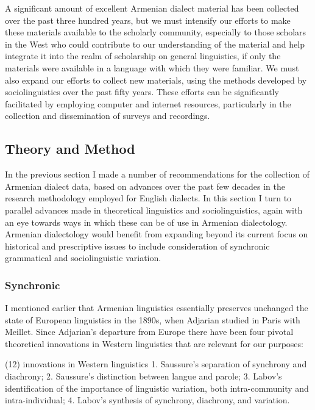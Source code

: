 A significant amount of excellent Armenian dialect material has been collected over the past three hundred years, but we must intensify our efforts to make these materials available to the scholarly community, especially to those scholars in the West who could contribute to our understanding of the material and help integrate it into the realm of scholarship on general linguistics, if only the materials were available in a language with which they were familiar. We must also expand our efforts to collect new materials, using the methods developed by sociolinguistics over the past fifty years. These efforts can be significantly facilitated by employing computer and internet resources, particularly in the collection and dissemination of surveys and recordings.

\subsection{Theory and Method}

In the previous section I made a number of recommendations for the collection of Armenian dialect data, based on advances over the past few decades in the research methodology employed for English dialects. In this section I turn to parallel advances made in theoretical linguistics and sociolinguistics, again with an eye towards ways in which these can be of use in Armenian dialectology. Armenian dialectology would benefit from expanding beyond its current focus on historical and prescriptive issues to include consideration of synchronic grammatical and sociolinguistic variation.

\subsubsection{Synchronic}

I mentioned earlier that Armenian linguistics essentially preserves unchanged the state of European linguistics in the 1890s, when Adjarian studied in Paris with Meillet. Since Adjarian’s departure from Europe there have been four pivotal theoretical innovations in Western linguistics that are relevant for our purposes: 

\begin{exe}
(12) innovations in Western linguistics
1. 	Saussure’s separation of synchrony and diachrony;
2. 	Saussure’s distinction between langue and parole;
3.	Labov’s identification of the importance of linguistic variation, both intra-community and intra-individual;
4.	Labov’s synthesis of synchrony, diachrony, and variation.

\end{exe}

